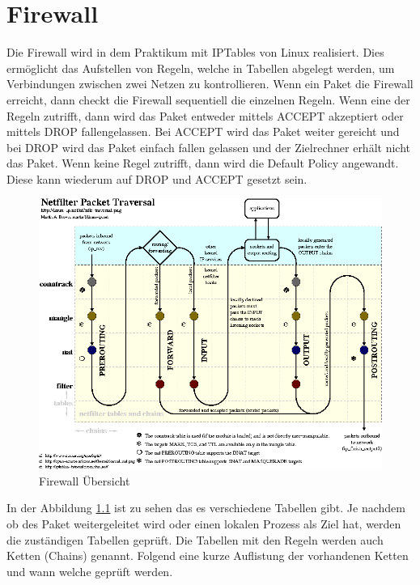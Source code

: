 \chapter{Firewall}
Die Firewall wird in dem Praktikum mit IPTables von Linux realisiert. Dies ermöglicht das Aufstellen von Regeln, welche in Tabellen abgelegt werden, um Verbindungen zwischen zwei Netzen zu kontrollieren. Wenn ein Paket die Firewall erreicht, dann checkt die Firewall sequentiell die einzelnen Regeln. Wenn eine der Regeln zutrifft, dann wird das Paket entweder mittels ACCEPT akzeptiert oder mittels DROP fallengelassen. Bei ACCEPT wird das Paket weiter gereicht und bei DROP wird das Paket einfach fallen gelassen und der Zielrechner erhält nicht das Paket. Wenn keine Regel zutrifft, dann wird die Default Policy angewandt. Diese kann wiederum auf DROP und ACCEPT gesetzt sein. 
\begin{figure}
	\centering
		\includegraphics[width=1.00\textwidth]{figures/firewall_uebersicht.PNG}
	\caption{Firewall Übersicht \cite{linux-ip}}
	\label{fig:firewall_uebersicht}
\end{figure}
In der Abbildung \ref{fig:firewall_uebersicht} ist zu sehen das es verschiedene Tabellen gibt. Je nachdem ob des Paket weitergeleitet wird oder einen lokalen Prozess als Ziel hat, werden die zuständigen Tabellen geprüft. Die Tabellen mit den Regeln werden auch Ketten (Chains) genannt. Folgend eine kurze Auflistung der vorhandenen Ketten und wann welche geprüft werden.
